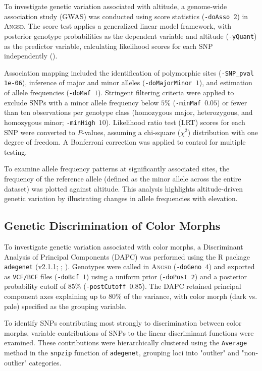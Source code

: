 \documentclass[9pt,a4paper,twoside]{rho-class/rho}
\begin{document}
        To investigate genetic variation associated with altitude, a genome-wide association study (GWAS) was conducted using score statistics (\texttt{-doAsso $2$}) in \textsc{Angsd}. The score test applies a generalized linear model framework, with posterior genotype probabilities as the dependent variable and altitude (\texttt{-yQuant}) as the predictor variable, calculating likelihood scores for each SNP independently (\cite{Skotte2012}).

        Association mapping included the identification of polymorphic sites (\texttt{-SNP\_pval 1e-06}), inference of major and minor alleles (\texttt{-doMajorMinor $1$}), and estimation of allele frequencies (\texttt{-doMaf $1$}). Stringent filtering criteria were applied to exclude SNPs with a minor allele frequency below $5\%$ (\texttt{-minMaf $0.05$}) or fewer than ten observations per genotype class (homozygous major, heterozygous, and homozygous minor; \texttt{-minHigh $10$}). Likelihood ratio test (LRT) scores for each SNP were converted to \textit{P}-values, assuming a chi-square ($\chi^2$) distribution with one degree of freedom. A Bonferroni correction was applied to control for multiple testing.
        
        To examine allele frequency patterns at significantly associated sites, the frequency of the reference allele (defined as the minor allele across the entire dataset) was plotted against altitude. This analysis highlights altitude-driven genetic variation by illustrating changes in allele frequencies with elevation.

    \subsection{Genetic Discrimination of Color Morphs}
        To investigate genetic variation associated with color morphs, a Discriminant Analysis of Principal Components (DAPC) was performed using the R package \texttt{adegenet} (v2.1.1; \cite{Jombart2008}; \cite{Jombart2011}). Genotypes were called in \textsc{Angsd} (\texttt{-doGeno $4$}) and exported as \texttt{VCF/BCF} files (\texttt{-doBcf $1$}) using a uniform prior (\texttt{-doPost 2}) and a posterior probability cutoff of $85\%$ (\texttt{-postCutoff $0.85$}). The DAPC retained principal component axes explaining up to $80\%$ of the variance, with color morph (dark vs. pale) specified as the grouping variable.
        
        To identify SNPs contributing most strongly to discrimination between color morphs, variable contributions of SNPs to the linear discriminant functions were examined. These contributions were hierarchically clustered using the \texttt{Average} method in the \texttt{snpzip} function of \texttt{adegenet}, grouping loci into "outlier" and "non-outlier" categories.
        
\end{document}
